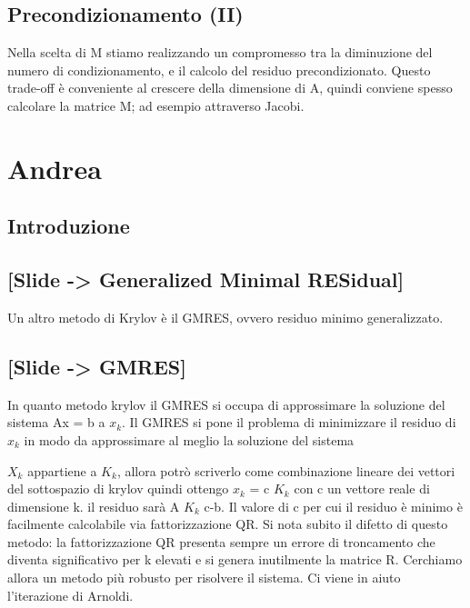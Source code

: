 \documentclass[a4paper]{article}
\begin{document}
\subsection*{Precondizionamento (II)}
Nella scelta di M stiamo realizzando un compromesso tra la diminuzione del numero di condizionamento, e il calcolo del residuo precondizionato.
Questo trade-off è conveniente al crescere della dimensione di A, quindi conviene spesso calcolare la matrice M;
ad esempio attraverso Jacobi.


\section*{Andrea}
\subsection*{Introduzione}

\subsection*{[Slide -> Generalized Minimal RESidual]}
Un altro metodo di Krylov è il GMRES, ovvero residuo minimo generalizzato. 

\subsection*{[Slide -> GMRES]}
In quanto metodo krylov il GMRES si occupa di approssimare la soluzione del sistema Ax = b a $x_k$.
Il GMRES si pone il problema di minimizzare il residuo di $x_k$ in modo da approssimare al meglio la soluzione del sistema

$X_k$ appartiene a $K_k$, allora potrò scriverlo come combinazione lineare dei vettori del sottospazio di krylov quindi ottengo $x_k$ = c $K_k$ con c un vettore reale di dimensione k. il residuo sarà A $K_k$ c-b.
Il valore di c per cui il residuo è minimo è facilmente calcolabile via fattorizzazione QR.
Si nota subito il difetto di questo metodo: la fattorizzazione QR presenta sempre un errore di troncamento che diventa significativo per k elevati e si genera inutilmente la matrice R. Cerchiamo allora un metodo più robusto per risolvere il sistema.
Ci viene in aiuto l’iterazione di Arnoldi.
\end{document}
